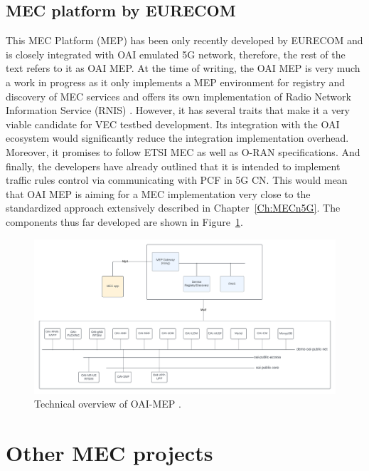 \documentclass[12pt,a4paper,twoside]{report}
\begin{document}
\subsection{MEC platform by EURECOM}
This MEC Platform (MEP) has been only recently developed by EURECOM and is closely integrated with OAI emulated 5G network, therefore, the rest of the text refers to it as OAI MEP. At the time of writing, the OAI MEP is very much a work in progress as it only implements a MEP environment for registry and discovery of MEC services and offers its own implementation of Radio Network Information Service (RNIS) \cite{oai-mep-git}. However, it has several traits that make it a very viable candidate for VEC testbed development. Its integration with the OAI ecosystem would significantly reduce the integration implementation overhead. Moreover, it promises to follow ETSI MEC as well as O-RAN specifications. And finally, the developers have already outlined that it is intended to implement traffic rules control via communicating with PCF in 5G CN. This would mean that OAI MEP is aiming for a MEC implementation very close to the standardized approach extensively described in Chapter~\ref{Ch:MECn5G}. The components thus far developed are shown in Figure~\ref{F:oai-mep}.
\begin{figure}[ht]
	\centering
	\includegraphics[width=\textwidth]{./images/OAI-MEP.png}
	\caption{Technical overview of OAI-MEP \cite{oai-mep-git}.}
	\label{F:oai-mep}
\end{figure}
\FloatBarrier

\section{Other MEC projects}
\end{document}
